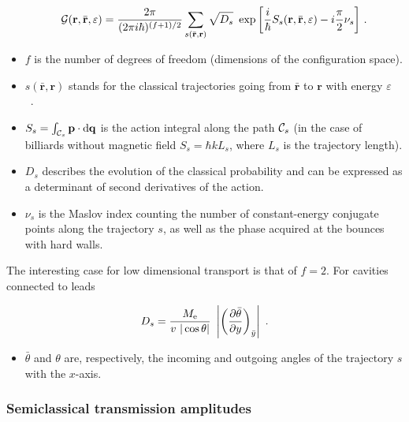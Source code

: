 \documentclass[a4paper,10pt]{article}
\newcommand{\br}{\mathbf{r}}
\newcommand{\barbr}{\bar {\mathbf r}}
\newcommand{\nin}{\noindent}
\def\Me{M_{\rm e}}
\newcommand{\be}{\begin{equation}}
\newcommand{\ee}{\end{equation}}
\newcommand{\C}{{\cal C}}
\newcommand{\bp}{{\bf p}}
\newcommand{\bq}{{\bf q}}
\begin{document}
\be
\hspace{0.6cm} 
\mathcal{G}(\br,\barbr,\varepsilon) = 
\frac{2\pi}{(2\pi i\hbar)^{(f+1)/2}} \sum_{s(\barbr,\br)} \sqrt {D_{s}} \ \exp{\left[\frac{i}{\hbar}S_{s}(\br,\barbr,\varepsilon)-
i \frac{\pi}{2}\nu _{s}\right]} \ .
\label{eq:gfgutz}
\ee

\begin{itemize}

\item $f$ is the number of degrees of freedom (dimensions of the configuration space). 

\item $s(\barbr,\br)$ stands for the classical trajectories going from 
$\barbr$ to $\br$ with energy $\varepsilon$ \ .

\item $S_{s}=\int_{\C_s} \bp \cdot \bf{\rm d}\bq$ is the action integral along the path $\C_s$ (in the case of billiards without magnetic field $S_{s} = \hbar k L_{s}$, where $L_{s}$ is the trajectory length).
  
\item $D_{s}$ describes the evolution of the classical probability and can be expressed as a determinant of second derivatives of the action. 

\item $\nu_s$ is the Maslov index counting the number of constant-energy conjugate points along the trajectory $s$, as well as the phase acquired at the bounces with hard walls.

\end{itemize}

\nin The interesting case for low dimensional transport is that of $f\!=\!2$. For cavities connected to leads

\be
D_{s}=\frac{\Me}{v \ |\cos{\theta}|} \
\left| \left(\frac{\partial {\bar \theta}}{\partial y}\right)_{\bar y} \right| \ .
\ee
 
\begin{itemize}

\item 
${\bar \theta}$ and $\theta$ are, respectively, the incoming and outgoing angles of the trajectory $s$ with the $x$-axis.  
\end{itemize}

\subsubsection{Semiclassical transmission amplitudes}
\label{subsub:sta}
\end{document}
